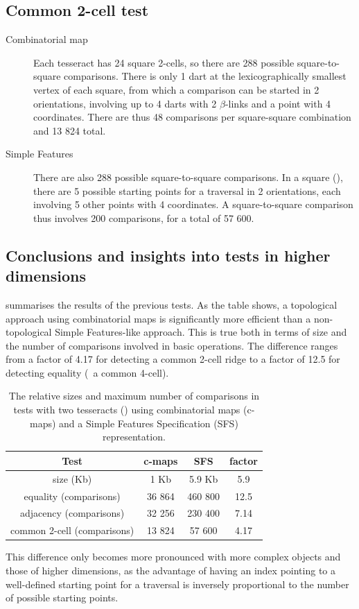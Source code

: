 \subsection*{Common 2-cell test}

\begin{description}
\item[Combinatorial map] Each tesseract has 24 square 2-cells, so there are 288 possible square-to-square comparisons.
There is only 1 dart at the lexicographically smallest vertex of each square, from which a comparison can be started in 2 orientations, involving up to 4 darts with 2 $\beta$-links and a point with 4 coordinates.
There are thus 48 comparisons per square-square combination and 13 824 total.

\item[Simple Features] There are also 288 possible square-to-square comparisons.
In a square (), there are 5 possible starting points for a traversal in 2 orientations, each involving 5 other points with 4 coordinates.
A square-to-square comparison thus involves 200 comparisons, for a total of 57 600.
\end{description}

\subsection*{Conclusions and insights into tests in higher dimensions}

 summarises the results of the previous tests.
As the table shows, a topological approach using combinatorial maps is significantly more efficient than a non-topological Simple Features-like approach.
This is true both in terms of size and the number of comparisons involved in basic operations.
The difference ranges from a factor of 4.17 for detecting a common 2-cell ridge to a factor of 12.5 for detecting equality (\ie\ a common 4-cell).

\begin{table}[tbp]
\caption[Tesseract comparison test results]{The relative sizes and maximum number of comparisons in tests with two tesseracts () using combinatorial maps (c-maps) and a Simple Features Specification (SFS) representation.}
\centering
\small
\begin{tabular}{cccc}
\toprule
Test & c-maps & SFS & factor \\
\midrule
size (Kb) & 1 Kb & 5.9 Kb & 5.9 \\
equality (comparisons) & 36 864 & 460 800 & 12.5 \\
adjacency (comparisons) & 32 256 & 230 400 & 7.14 \\
common 2-cell (comparisons) & 13 824 & 57 600 & 4.17 \\
\bottomrule
\end{tabular}
\label{table:comparison-tests}
\end{table}

This difference only becomes more pronounced with more complex objects and those of higher dimensions, as the advantage of having an index pointing to a well-defined starting point for a traversal is inversely proportional to the number of possible starting points.